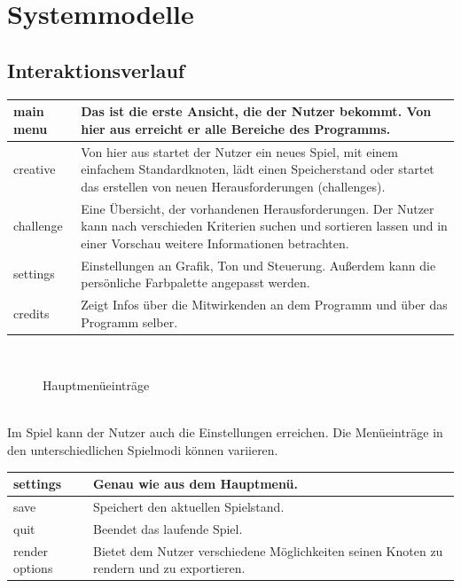 \chapter{Systemmodelle}


\section{Interaktionsverlauf}

	\begin{longtable}{|p{}|p{}|}
    \hline
    main menu & Das ist die erste Ansicht, die der Nutzer bekommt. Von hier aus erreicht er alle Bereiche des Programms.\\
    \hline
    creative & Von hier aus startet der Nutzer ein neues Spiel, mit einem einfachem Standardknoten, lädt einen Speicherstand oder startet das erstellen von neuen Herausforderungen (challenges).\\
    \hline
    challenge & Eine Übersicht, der vorhandenen Herausforderungen. Der Nutzer kann nach verschieden Kriterien suchen und sortieren lassen und in einer Vorschau weitere Informationen betrachten.\\
    \hline
    settings & Einstellungen an Grafik, Ton und Steuerung. Außerdem kann die persönliche Farbpalette angepasst werden.\\
    \hline
    credits & Zeigt Infos über die Mitwirkenden an dem Programm und über das Programm selber.\\
    \hline
    
   \end{longtable}
   
   ~\\
    
	\begin{figure}[h]
		\centering
	 	
	 	\caption{Hauptmenüeinträge}
	\end{figure}
	
	\clearpage
	~\\
	
	Im Spiel kann der Nutzer auch die {\color{red} Einstellungen} erreichen. Die Menüeinträge in den unterschiedlichen Spielmodi können variieren.

	\begin{longtable}{|p{}|p{}|}
	
	\hline
	settings & Genau wie aus dem Hauptmenü.\\
	\hline
	save & Speichert den aktuellen Spielstand.\\
	\hline
	quit & Beendet das laufende Spiel. \\
	\hline
	render options & Bietet dem Nutzer verschiedene Möglichkeiten seinen Knoten zu rendern und zu exportieren.\\
	\hline
	
	\end{longtable}
	
